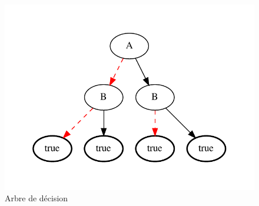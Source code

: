 \documentclass[a4paper,11pt]{article}
\begin{document}
\begin{figure}[!htb]
  \begin{minipage}{0.5\textwidth}
    \centering
    \includegraphics[width=1\linewidth]{tests_rapport/test2_dectree.pdf}
    \caption*{Arbre de décision}
  \end{minipage}\hfill
  \begin{minipage}{0.25\textwidth}
    \centering

\end{minipage}
\end{figure}
\end{document}
